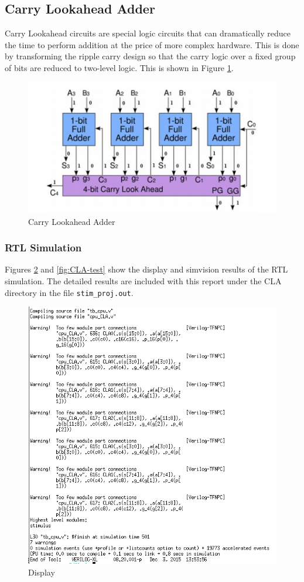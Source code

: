 \documentclass[12pt]{article}
\begin{document}
\subsection{Carry Lookahead Adder}
Carry Lookahead circuits are special logic circuits that can dramatically reduce the time to perform addition at the price of more complex hardware. This is done by transforming the ripple carry design so that the carry logic over a fixed group of bits are reduced to two-level logic. This is shown in Figure \ref{fig:carry-lookahead}.
\begin{figure}[H]
\centering
\includegraphics[width=0.7\linewidth]{carry-lookahead}
\caption{Carry Lookahead Adder}
\label{fig:carry-lookahead}
\end{figure}

\subsubsection{RTL Simulation}
Figures \ref{fig:CLA-text} and \ref{fig:CLA-test} show the display and simvision results of the RTL simulation. The detailed results are included with this report under the CLA directory in the file \texttt{stim\_proj.out}.

\begin{figure}[H]
\centering
\includegraphics[width=0.7\linewidth]{../CLA/CLA-text}
\caption{Display}
\label{fig:CLA-text}
\end{figure}
\end{document}
